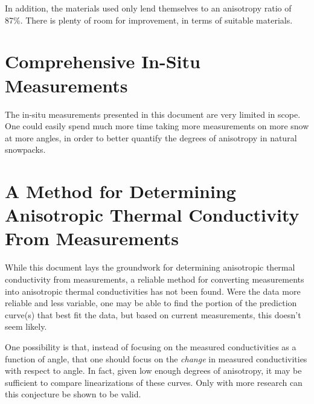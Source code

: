 In addition, the materials used only lend themselves to an anisotropy ratio of
87\%. There is plenty of room for improvement, in terms of suitable materials.

\section{Comprehensive In-Situ Measurements}

The in-situ measurements presented in this document are very limited in scope.
One could easily spend much more time taking more measurements on more snow at
more angles, in order to better quantify the degrees of anisotropy in natural
snowpacks.

\section{A Method for Determining Anisotropic Thermal Conductivity From Measurements}

While this document lays the groundwork for determining anisotropic thermal
conductivity from measurements, a reliable method for converting measurements
into anisotropic thermal conductivities has not been found. Were the data
more reliable and less variable, one may be able to find the portion of the
prediction curve(s) that best fit the data, but based on current measurements,
this doesn't seem likely.

One possibility is that, instead of focusing on the measured conductivities as a
function of angle, that one should focus on the \emph{change} in measured
conductivities with respect to angle. In fact, given low enough degrees of
anisotropy, it may be sufficient to compare linearizations of these curves. Only
with more research can this conjecture be shown to be valid.
